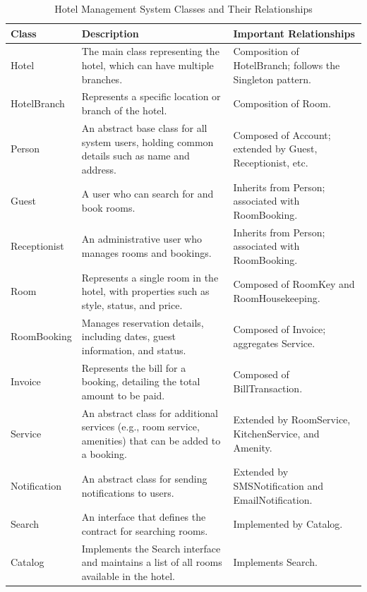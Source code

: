 \begin{table}[h!]
\centering
\begin{tabular}{|p{3.5cm}|p{6.5cm}|p{6cm}|}
\hline
\textbf{Class} & \textbf{Description} & \textbf{Important Relationships} \\
\hline
Hotel & 
The main class representing the hotel, which can have multiple branches. & 
Composition of HotelBranch; follows the Singleton pattern. \\
\hline
HotelBranch & 
Represents a specific location or branch of the hotel. & 
Composition of Room. \\
\hline
Person & 
An abstract base class for all system users, holding common details such as name and address. & 
Composed of Account; extended by Guest, Receptionist, etc. \\
\hline
Guest & 
A user who can search for and book rooms. & 
Inherits from Person; associated with RoomBooking. \\
\hline
Receptionist & 
An administrative user who manages rooms and bookings. & 
Inherits from Person; associated with RoomBooking. \\
\hline
Room & 
Represents a single room in the hotel, with properties such as style, status, and price. & 
Composed of RoomKey and RoomHousekeeping. \\
\hline
RoomBooking & 
Manages reservation details, including dates, guest information, and status. & 
Composed of Invoice; aggregates Service. \\
\hline
Invoice & 
Represents the bill for a booking, detailing the total amount to be paid. & 
Composed of BillTransaction. \\
\hline
Service & 
An abstract class for additional services (e.g., room service, amenities) that can be added to a booking. & 
Extended by RoomService, KitchenService, and Amenity. \\
\hline
Notification & 
An abstract class for sending notifications to users. & 
Extended by SMSNotification and EmailNotification. \\
\hline
Search & 
An interface that defines the contract for searching rooms. & 
Implemented by Catalog. \\
\hline
Catalog & 
Implements the Search interface and maintains a list of all rooms available in the hotel. & 
Implements Search. \\
\hline
\end{tabular}
\caption{Hotel Management System Classes and Their Relationships}
\label{tab:hotel_classes}
\end{table}


